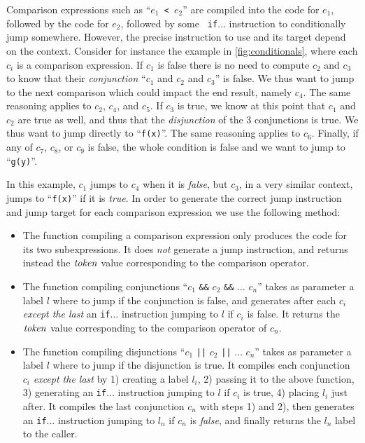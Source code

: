 Comparison expressions such as ``{\tt $e_1$ < $e_2$}'' are compiled into the
code for $e_1$, followed by the code for $e_2$, followed by some {\tt
if$\ldots$} instruction to conditionally jump somewhere. However, the precise
instruction to use and its target depend on the context. Consider for instance
the example in \cref{fig:conditionals}, where each $c_i$ is a comparison
expression. If $c_1$ is false there is no need to compute $c_2$ and $c_3$ to
know that their {\em conjunction} ``$c_1$ and $c_2$ and $c_3$'' is false. We
thus want to jump to the next comparison which could impact the end result,
namely $c_4$. The same reasoning applies to $c_2$, $c_4$, and $c_5$. If $c_3$
is true, we know at this point that $c_1$ and $c_2$ are true as well, and thus
that the {\em disjunction} of the 3 conjunctions is true. We thus want to jump
directly to ``{\tt f(x)}''. The same reasoning applies to $c_6$. Finally, if
any of $c_7$, $c_8$, or $c_9$ is false, the whole condition is false and we
want to jump to ``{\tt g(y)}''.

In this example, $c_1$ jumps to $c_4$ when it is {\em false}, but $c_3$, in a
very similar context, jumps to ``{\tt f(x)}'' if it is {\em true}. In order to
generate the correct jump instruction and jump target for each comparison
expression we use the following method:
\begin{itemize}
  \item The function compiling a comparison expression only produces the code
  for its two subexpressions. It does {\em not} generate a jump instruction,
  and returns instead the $\it{token}$ value corresponding to the comparison
  operator.

  \item The function compiling conjunctions ``$c_1$ {\tt \&\&} $c_2$ {\tt \&\&}
  $\ldots$ $c_n$'' takes as parameter a label $l$ where to jump if the
  conjunction is false, and generates after each $c_i$ {\em except the last} an
  {\tt if$\ldots$} instruction jumping to $l$ if $c_i$ is false. It returns the
  $\it{token}$ value corresponding to the comparison operator of $c_n$.

  \item The function compiling disjunctions ``$c_1$ {\tt ||} $c_2$ {\tt ||}
  $\ldots$ $c_n$'' takes as parameter a label $l$ where to jump if the
  disjunction is true. It compiles each conjunction $c_i$ {\em except the last}
  by 1) creating a label $l_i$, 2) passing it to the above function, 3)
  generating an {\tt if$\ldots$} instruction jumping to $l$ if $c_i$ is true,
  4) placing $l_i$ just after. It compiles the last conjunction $c_n$ with
  steps 1) and 2), then generates an {\tt if$\ldots$} instruction jumping to
  $l_n$ if $c_n$ is {\em false}, and finally returns the $l_n$ label to the
  caller.
\end{itemize}

